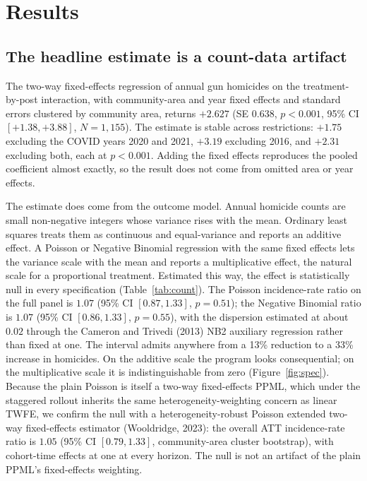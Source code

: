 \documentclass[12pt]{article}
\begin{document}
\section{Results}

\subsection{The headline estimate is a count-data artifact}

The two-way fixed-effects regression of annual gun homicides on the treatment-by-post
interaction, with community-area and year fixed effects and standard errors clustered by
community area, returns $+2.627$ (SE $0.638$, $p < 0.001$, 95\% CI $[+1.38, +3.88]$, $N =
1{,}155$). The estimate is stable across restrictions: $+1.75$ excluding the COVID years
2020 and 2021, $+3.19$ excluding 2016, and $+2.31$ excluding both, each at $p < 0.001$.
Adding the fixed effects reproduces the pooled coefficient almost exactly, so the result
does not come from omitted area or year effects.

The estimate does come from the outcome model. Annual homicide counts are small
non-negative integers whose variance rises with the mean. Ordinary least squares treats
them as continuous and equal-variance and reports an additive effect. A Poisson or
Negative Binomial regression with the same fixed effects lets the variance scale with the
mean and reports a multiplicative effect, the natural scale for a proportional treatment.
Estimated this way, the effect is statistically null in every specification
(Table~\ref{tab:count}). The Poisson incidence-rate ratio on the full panel is $1.07$
(95\% CI $[0.87, 1.33]$, $p = 0.51$); the Negative Binomial ratio is $1.07$ (95\% CI
$[0.86, 1.33]$, $p = 0.55$), with the dispersion estimated at about $0.02$ through the
Cameron and Trivedi (2013) NB2 auxiliary regression rather than fixed at one. The interval
admits anywhere from a 13\% reduction to a 33\% increase in homicides. On the additive
scale the program looks consequential; on the multiplicative scale it is indistinguishable
from zero (Figure~\ref{fig:spec}). Because the plain Poisson is itself a two-way fixed-effects
PPML, which under the staggered rollout inherits the same heterogeneity-weighting concern as
linear TWFE, we confirm the null with a heterogeneity-robust Poisson extended two-way
fixed-effects estimator (Wooldridge, 2023): the overall ATT incidence-rate ratio is $1.05$
(95\% CI $[0.79, 1.33]$, community-area cluster bootstrap), with cohort-time effects at one
at every horizon. The null is not an artifact of the plain PPML's fixed-effects weighting.
\end{document}
